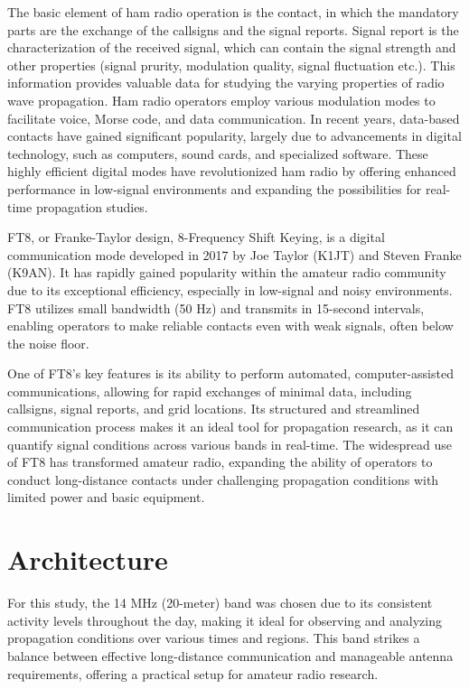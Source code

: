 \documentclass[conference]{IEEEtran}
\begin{document}
The basic element of ham radio operation is the contact, in which the mandatory
parts are the exchange of the callsigns and the signal reports. Signal report
is the characterization of the received signal, which can contain the signal strength
and other properties (signal prurity, modulation quality, signal fluctuation etc.).
This information provides valuable data for studying the varying properties of radio
wave propagation.
Ham radio operators employ various modulation modes to facilitate voice, Morse
code, and data communication. In recent years, data-based contacts have gained
significant popularity, largely due to advancements in digital technology, such
as computers, sound cards, and specialized software. These highly efficient
digital modes have revolutionized ham radio by offering enhanced performance in
low-signal environments and expanding the possibilities for real-time
propagation studies.

FT8, or Franke-Taylor design, 8-Frequency Shift Keying, is a digital
communication mode developed in 2017 by Joe Taylor (K1JT) and Steven Franke
(K9AN). It has rapidly gained popularity within the amateur radio community due
to its exceptional efficiency, especially in low-signal and noisy environments.
FT8 utilizes small bandwidth (50 Hz) and transmits in 15-second intervals,
enabling operators to make reliable contacts even with weak signals, often
below the noise floor.

One of FT8's key features is its ability to perform automated,
computer-assisted communications, allowing for rapid exchanges of minimal data,
including callsigns, signal reports, and grid locations. Its structured and
streamlined communication process makes it an ideal tool for propagation
research, as it can quantify signal conditions across various bands in
real-time. The widespread use of FT8 has transformed amateur radio, expanding
the ability of operators to conduct long-distance contacts under challenging
propagation conditions with limited power and basic equipment.

\section{Architecture}

For this study, the 14 MHz (20-meter) band was chosen due to its consistent
activity levels throughout the day, making it ideal for observing and analyzing
propagation conditions over various times and regions. This band strikes a
balance between effective long-distance communication and manageable antenna
requirements, offering a practical setup for amateur radio research.
\end{document}
